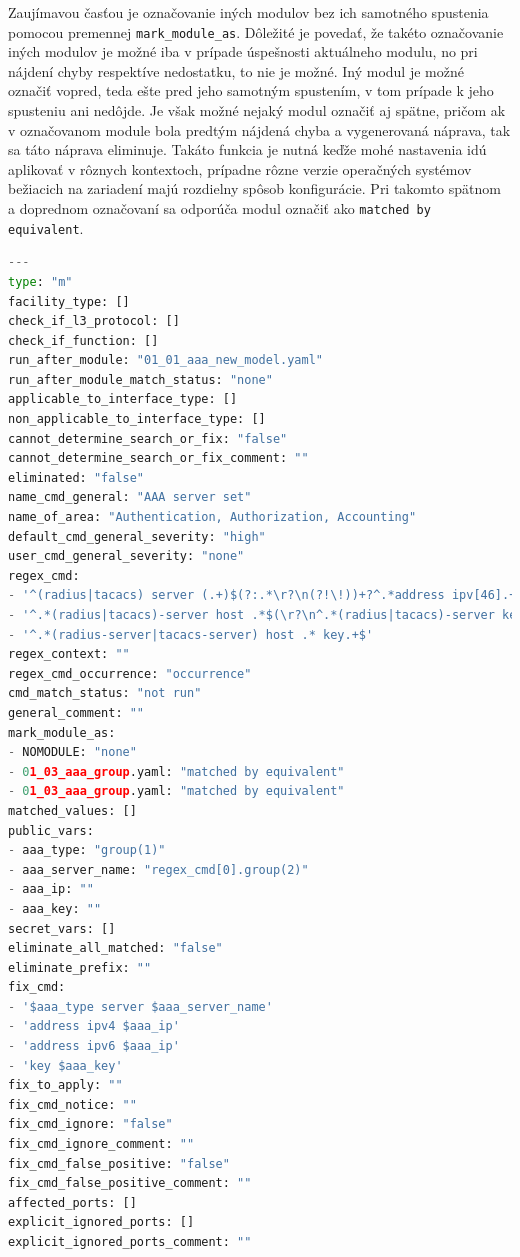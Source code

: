 \vspace{1em}

Zaujímavou časťou je označovanie iných modulov bez ich samotného spustenia pomocou premennej \texttt{mark\_module\_as}. Dôležité je povedať, že takéto označovanie iných modulov je možné iba v prípade úspešnosti aktuálneho modulu, no pri nájdení chyby respektíve nedostatku, to nie je možné. Iný modul je možné označiť vopred, teda ešte pred jeho samotným spustením, v tom prípade k jeho spusteniu ani nedôjde. Je však možné nejaký modul označiť aj spätne, pričom ak v označovanom module bola predtým nájdená chyba a vygenerovaná náprava, tak sa táto náprava eliminuje. Takáto funkcia je nutná keďže mohé nastavenia idú aplikovať v rôznych kontextoch, prípadne rôzne verzie operačných systémov bežiacich na zariadení majú rozdielny spôsob konfigurácie. Pri takomto spätnom a doprednom označovaní sa odporúča modul označiť ako \texttt{matched by equivalent}.


\begin{lstlisting}[frame=single,numbers=right,caption={Konfiguračný súbor \texttt{01\_02\_aaa\_server.yaml}, ktorý popisuje základné informácie o~jednom konkrétnom zariadení},label=yaml:module,basicstyle=\ttfamily\small,rulecolor=\color{black}, keywordstyle=\color{black},language=python,breaklines=true]
---
type: "m"
facility_type: []
check_if_l3_protocol: []
check_if_function: []
run_after_module: "01_01_aaa_new_model.yaml"
run_after_module_match_status: "none"
applicable_to_interface_type: []
non_applicable_to_interface_type: [] 
cannot_determine_search_or_fix: "false" 
cannot_determine_search_or_fix_comment: ""
eliminated: "false" 
name_cmd_general: "AAA server set"
name_of_area: "Authentication, Authorization, Accounting"
default_cmd_general_severity: "high" 
user_cmd_general_severity: "none"
regex_cmd:
- '^(radius|tacacs) server (.+)$(?:.*\r?\n(?!\!))+?^.*address ipv[46].+$(?:\r?\n^.*key.+$)?(?:.*\r?\n)*?(?=\!)'
- '^.*(radius|tacacs)-server host .*$(\r?\n^.*(radius|tacacs)-server key.*$)?'
- '^.*(radius-server|tacacs-server) host .* key.+$'
regex_context: ""
regex_cmd_occurrence: "occurrence"
cmd_match_status: "not run"
general_comment: ""
mark_module_as:
- NOMODULE: "none"
- 01_03_aaa_group.yaml: "matched by equivalent"
- 01_03_aaa_group.yaml: "matched by equivalent"
matched_values: []
public_vars:
- aaa_type: "group(1)"
- aaa_server_name: "regex_cmd[0].group(2)"
- aaa_ip: ""
- aaa_key: ""
secret_vars: []
eliminate_all_matched: "false"
eliminate_prefix: ""
fix_cmd: 
- '$aaa_type server $aaa_server_name'
- 'address ipv4 $aaa_ip'
- 'address ipv6 $aaa_ip'
- 'key $aaa_key'
fix_to_apply: "" 
fix_cmd_notice: ""
fix_cmd_ignore: "false"
fix_cmd_ignore_comment: ""
fix_cmd_false_positive: "false"
fix_cmd_false_positive_comment: "" 
affected_ports: []
explicit_ignored_ports: []
explicit_ignored_ports_comment: "" 
\end{lstlisting}
\newpage
